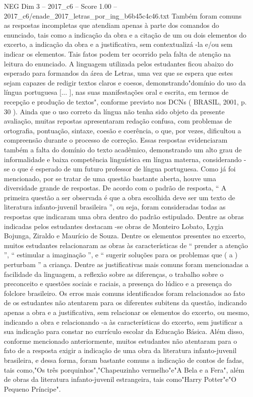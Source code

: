 \begin{textsample}{NEG Dim 3 – 2017\_c6 – Score 1.00 – 2017\_c6/enade\_2017\_letras\_por\_ing\_b6b45c4c46.txt}
Também foram comuns as respostas incompletas que atendiam apenas à parte dos comandos do enunciado, tais como a indicação da obra e a citação de um ou dois elementos do excerto, a indicação da obra e a justificativa, sem contextualizá -la e/ou sem indicar os elementos.
Tais fatos podem ter ocorrido pela falta de atenção na leitura do enunciado.
A linguagem utilizada pelos estudantes ficou abaixo do esperado para formandos da área de Letras, uma vez que se espera que estes sejam capazes de redigir textos claros e coesos, demonstrando"domínio do uso da língua portuguesa [... ], nas suas manifestações oral e escrita, em termos de recepção e produção de textos", conforme previsto nos DCNs ( BRASIL, 2001, p. 30 ).
Ainda que o uso correto da língua não tenha sido objeto da presente avaliação, muitas repostas apresentaram redação confusa, com problemas de ortografia, pontuação, sintaxe, coesão e coerência, o que, por vezes, dificultou a compreensão durante o processo de correção.
Essas respostas evidenciaram também a falta do domínio do texto acadêmico, demonstrando um alto grau de informalidade e baixa competência linguística em língua materna, considerando -se o que é esperado de um futuro professor de língua portuguesa.
Como já foi mencionado, por se tratar de uma questão bastante aberta, houve uma diversidade grande de respostas.
De acordo com o padrão de resposta, “ A primeira questão a ser observada é que a obra escolhida deve ser um texto de literatura infanto-juvenil brasileira ”, ou seja, foram consideradas todas as respostas que indicaram uma obra dentro do padrão estipulado.
Dentre as obras indicadas pelos estudantes destacam -se obras de Monteiro Lobato, Lygia Bojunga, Ziraldo e Maurício de Souza.
Dentre os elementos presentes no excerto, muitos estudantes relacionaram as obras às características de “ prender a atenção ”, “ estimular a imaginação ”, e “ sugerir soluções para os problemas que ( a ) perturbam ” a criança.
Dentre as justificativas mais comuns foram mencionadas a facilidade da linguagem, a reflexão sobre as diferenças, o trabalho sobre o preconceito e questões sociais e raciais, a presença do lúdico e a presença do folclore brasileiro.
Os erros mais comuns identificados foram relacionados ao fato de os estudantes não atentarem para os diferentes subitens da questão, indicando apenas a obra e a justificativa, sem relacionar os elementos do excerto, ou mesmo, indicando a obra e relacionando -a às características do excerto, sem justificar a sua indicação para constar no currículo escolar da Educação Básica.
Além disso, conforme mencionado anteriormente, muitos estudantes não atentaram para o fato de a resposta exigir a indicação de uma obra da literatura infanto-juvenil brasileira, e dessa forma, foram bastante comuns a indicação de contos de fadas, tais como,"Os três porquinhos","Chapeuzinho vermelho"e"A Bela e a Fera", além de obras da literatura infanto-juvenil estrangeira, tais como"Harry Potter"e"O Pequeno Príncipe".

\end{textsample}
